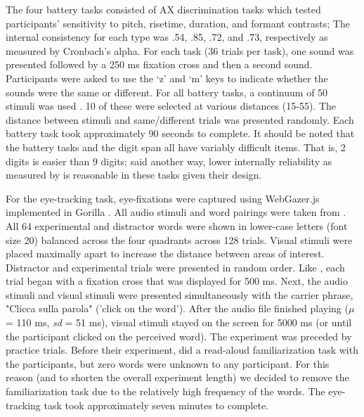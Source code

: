 The four battery tasks consisted of AX discrimination tasks which tested participants' sensitivity to pitch, risetime, duration, and formant contrasts; The internal consistency for each type was .54, .85, .72, and .73, respectively as measured by Cronbach's alpha. For each task (36 trials per task), one sound was presented followed by a 250 ms fixation cross and then a second sound. Participants were asked to use the `z' and `m' keys to indicate whether the sounds were the same or different. For all battery tasks, a continuum of 50 stimuli was used \citep{Kachlicka_Saito_Tierney_2019}. 10 of these were selected at various distances (15-55). The distance between stimuli and same/different trials was presented randomly. Each battery task took approximately 90 seconds to complete. It should be noted that the battery tasks and the digit span all have variably difficult items. That is, 2 digits is easier than 9 digits; said another way, lower internally reliability as measured by \citep{Cronbach1951} is reasonable in these tasks given their design. 

For the eye-tracking task, eye-fixations were captured using WebGazer.js \citep{Papoutsaki} implemented in Gorilla \citep{Anwyl-Irvine_2019}. All audio stimuli and word pairings were taken from \cite{Sulpizio_McQueen_2012}. All 64 experimental and distractor words were shown in lower-case letters (font size 20) balanced across the four quadrants across 128 trials. Visual stimuli were placed maximally apart to increase the distance between areas of interest. Distractor and experimental trials were presented in random order. Like \cite{Sulpizio_McQueen_2012}, each trial began with a fixation cross that was displayed for 500 ms. Next, the audio stimuli and visual stimuli were presented simultaneously with the carrier phrase, "Clicca sulla parola" ('click on the word'). After the audio file finished playing ($\mu$ = 110 ms, \textit{sd} = 51 ms), visual stimuli stayed on the screen for 5000 ms (or until the participant clicked on the perceived word). The experiment was preceded by practice trials. Before their experiment, \cite{Sulpizio_McQueen_2012} did a read-aloud familiarization task with the participants, but zero words were unknown to any participant. For this reason (and to shorten the overall experiment length) we decided to remove the familiarization task due to the relatively high frequency of the words. The eye-tracking task took approximately seven minutes to complete.

